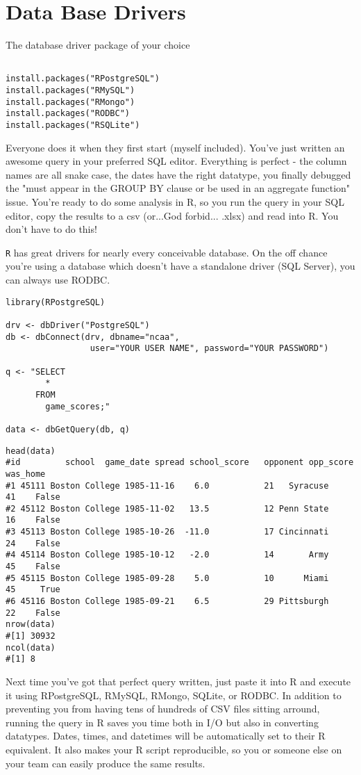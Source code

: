 \documentclass[french]{article}
\begin{document}
\section{Data Base Drivers}
The database driver package of your choice

\begin{framed}
\begin{verbatim}

install.packages("RPostgreSQL")
install.packages("RMySQL")
install.packages("RMongo")
install.packages("RODBC")
install.packages("RSQLite")
\end{verbatim}
\end{framed}
Everyone does it when they first start (myself included). You've just written an awesome query in your preferred SQL editor. Everything is perfect - the column names are all snake case, the dates have the right datatype, you finally debugged the "must appear in the GROUP BY clause or be used in an aggregate function" issue. You're ready to do some analysis in R, so you run the query in your SQL editor, copy the results to a csv (or...God forbid... .xlsx) and read into R. You don't have to do this!

\texttt{R} has great drivers for nearly every conceivable database. On the off chance you're using a database which doesn't have a standalone driver (SQL Server), you can always use RODBC.
\begin{framed}
\begin{verbatim}
library(RPostgreSQL)
 
drv <- dbDriver("PostgreSQL")
db <- dbConnect(drv, dbname="ncaa",
                 user="YOUR USER NAME", password="YOUR PASSWORD")
 
q <- "SELECT
        *
      FROM
        game_scores;"
 
data <- dbGetQuery(db, q)
\end{verbatim}
\end{framed}
{
\normalsize
\begin{verbatim}
head(data)
#id         school  game_date spread school_score   opponent opp_score was_home
#1 45111 Boston College 1985-11-16    6.0           21   Syracuse        41    False
#2 45112 Boston College 1985-11-02   13.5           12 Penn State        16    False
#3 45113 Boston College 1985-10-26  -11.0           17 Cincinnati        24    False
#4 45114 Boston College 1985-10-12   -2.0           14       Army        45    False
#5 45115 Boston College 1985-09-28    5.0           10      Miami        45     True
#6 45116 Boston College 1985-09-21    6.5           29 Pittsburgh        22    False
nrow(data)
#[1] 30932
ncol(data)
#[1] 8
\end{verbatim}
}
Next time you've got that perfect query written, just paste it into R and execute it using RPostgreSQL, RMySQL, RMongo, SQLite, or RODBC. In addition to preventing you from having tens of hundreds of CSV files sitting arround, running the query in R saves you time both in I/O but also in converting datatypes. Dates, times, and datetimes will be automatically set to their R equivalent. It also makes your R script reproducible, so you or someone else on your team can easily produce the same results.
\end{document}
